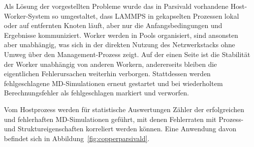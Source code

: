 Als Lösung der vorgestellten Probleme wurde das in Parsivald vorhandene Host-Worker-System so umgestaltet, dass LAMMPS in gekapselten Prozessen lokal oder auf entfernten Knoten läuft, aber nur die Anfangsbedingungen und Ergebnisse kommuniziert.
Worker werden in Pools organisiert, sind ansonsten aber unabhängig, was sich in der direkten Nutzung des Netzwerkstacks ohne Umweg über den Management-Prozess zeigt.
Auf der einen Seite ist die Stabilität der Worker unabhängig von anderen Workern, andererseits bleiben die eigentlichen Fehlerursachen weiterhin verborgen.
Stattdessen werden fehlgeschlagene MD-Simulationen erneut gestartet und bei wiederholtem Berechnungsfehler als fehlgeschlagen markiert und verworfen.

Vom Hostprozess werden für statistische Auswertungen Zähler der erfolgreichen und fehlerhaften MD-Simulationen geführt, mit denen Fehlerraten mit Prozess- und Struktureigenschaften korreliert werden können.
Eine Anwendung davon befindet sich in Abbildung~\ref{fig:copperparsivald}.

